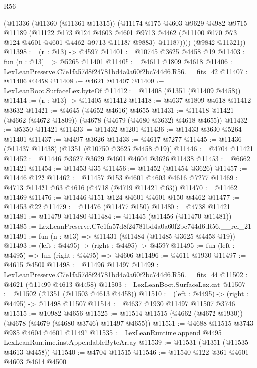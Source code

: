 \begin{lexlean}{R56}
\begin{coremodule}
        (@11336
          (@11360 (@11361 @11315))
          (@11174
            @175
            @4603
            @9629
            @4982
            @9715
            @11189
            (@11122
              @173
              @124
              @4603
              @4601
              @9713
              @4462
              (@11100 @170 @73 @124 @4601 @4601 @4462 @9713 @11187 @9883)
              @11187))))
      (@9842 @11321))
@11398 := (n : @13) -> @4597
@11401 := @10745 @3625 @4458 @19
@11403 := fun (n : @13) => @5265 @11401
@11405 := @4611 @1809 @4618
@11406 := LexLeanPreserve.C7e1fa57d8f24781bd4a0a60f2bc744d6.R56.__fits_42
@11407 := @11406 @4458
@11408 := @4621 @11407
@11409 := LexLeanBoot.SurfaceLex.byteOf
@11412 := @11408 (@1351 (@11409 @4458))
@11414 := (n : @13) -> @11405 @11412
@11418 := @4637 @1809 @4618 @11412 @3632
@11421 := @4645 (@4652 @4616) @4655
@11431 := @11418 @11421 (@4662 (@4672 @1809)) (@4678 (@4679 (@4680 @3632) @4618 @4655))
@11432 := @5350 @11421
@11433 := @11432 @1201
@11436 := @11433 @3630 @5264 @11401
@11437 := @4497 @3626
@11438 := @4617 @7277
@11445 := @11436 (@11437 @11438) (@1351 (@10750 @3625 @4458 @19))
@11446 := @4704 @11421
@11452 := @11446 @3627 @3629 @4601 @4604 @3626 @11438
@11453 := @6662 @11421
@11454 := @11453 @35
@11456 := @11452 (@11454 @3626)
@11457 := @11446 @122
@11462 := @11457 @153 @4601 @4603 @4616 @7277
@11469 := @4713 @11421 @63 @4616 (@4718 (@4719 @11421 @63))
@11470 := @11462 @11469
@11476 := @11446 @151 @124 @4601 @4601 @150 @4462
@11477 := @11453 @22
@11479 := @11476 (@11477 @150)
@11480 := @4738 @11421
@11481 := @11479 @11480
@11484 := @11445 (@11456 (@11470 @11481))
@11485 := LexLeanPreserve.C7e1fa57d8f24781bd4a0a60f2bc744d6.R56.__rel_21
@11491 := fun (n : @13) => @11431 (@11484 (@11485 @3625 @4458 @19))
@11493 := (left : @4495) -> (right : @4495) -> @4597
@11495 := fun (left : @4495) => fun (right : @4495) => @4606
@11496 := @4611 @1930
@11497 := @4615 @4500
@11498 := @11496 @11497
@11499 := LexLeanPreserve.C7e1fa57d8f24781bd4a0a60f2bc744d6.R56.__fits_44
@11502 := @4621 (@11499 @4613 @4458)
@11503 := LexLeanBoot.SurfaceLex.cat
@11507 := @11502 (@1351 (@11503 @4613 @4458))
@11510 := (left : @4495) -> (right : @4495) -> @11498 @11507
@11514 := @4637 @1930 @11497 @11507 @3746
@11515 := @10982 @4656
@11525 := @11514 @11515 (@4662 (@4672 @1930)) (@4678 (@4679 (@4680 @3746) @11497 @4655))
@11531 := @4688 @11515 @3743 @985 @4604 @4601 @11497
@11535 := LexLeanRuntime.append @4495 LexLeanRuntime.instAppendableByteArray
@11539 := @11531 (@1351 (@11535 @4613 @4458))
@11540 := @4704 @11515
@11546 := @11540 @122 @361 @4601 @4603 @4614 @4500

\end{coremodule}
\end{lexlean}
